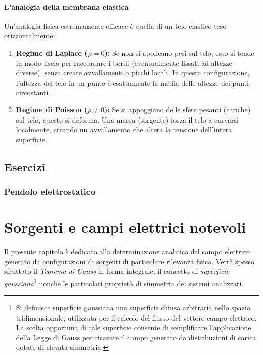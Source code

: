 \documentclass[a4paper,11pt]{report}
\begin{document}
\subsubsection{L'analogia della membrana elastica}
Un'analogia fisica estremamente efficace è quella di un telo elastico teso orizzontalmente:
\begin{enumerate}
    \item \textbf{Regime di Laplace ($\rho = 0$):} Se non si applicano pesi sul telo, esso si tende in modo liscio per raccordare i bordi (eventualmente fissati ad altezze diverse), senza creare avvallamenti o picchi locali. In questa configurazione, l'altezza del telo in un punto è esattamente la media delle altezze dei punti circostanti.
    \item \textbf{Regime di Poisson ($\rho \neq 0$):} Se si appoggiano delle sfere pesanti (cariche) sul telo, questo si deforma. Una massa (sorgente) forza il telo a curvarsi localmente, creando un avvallamento che altera la tensione dell'intera superficie.
\end{enumerate}

\newpage
\section{Esercizi}
\subsection{Pendolo elettrostatico}






\chapter{Sorgenti e campi elettrici notevoli}
Il presente capitolo è dedicato alla determinazione analitica del campo elettrico generato da configurazioni di sorgenti di particolare rilevanza fisica. Verrà spesso sfruttato il \textit{Teorema di Gauss} in forma integrale, il concetto di \textit{superficie gaussiana}\footnote{Si definisce superficie gaussiana una superficie chiusa arbitraria nello spazio tridimensionale, utilizzata per il calcolo del flusso del vettore campo elettrico. La scelta opportuna di tale superficie consente di semplificare l'applicazione della Legge di Gauss per ricavare il campo generato da distribuzioni di carica dotate di elevata simmetria. } nonché le particolari proprietà di simmetria dei sistemi analizzati.
\end{document}
